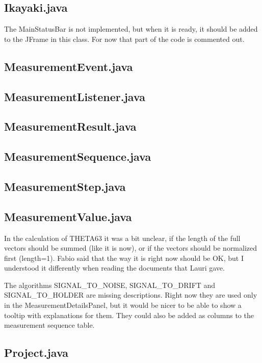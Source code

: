 \subsection{Ikayaki.java}

The MainStatusBar is not implemented, but when it is ready, it should be added to the JFrame in this class. For now that part of the code is commented out.


\subsection{MeasurementEvent.java}

\subsection{MeasurementListener.java}

\subsection{MeasurementResult.java}

\subsection{MeasurementSequence.java}

\subsection{MeasurementStep.java}

\subsection{MeasurementValue.java}

In the calculation of THETA63 it was a bit unclear, if the length of the full vectors should be summed (like it is now), or if the vectors should be normalized first (length=1). Fabio said that the way it is right now should be OK, but I understood it differently when reading the documents that Lauri gave.

The algorithms SIGNAL_TO_NOISE, SIGNAL_TO_DRIFT and SIGNAL_TO_HOLDER are missing descriptions. Right now they are used only in the MeasurementDetailsPanel, but it would be nicer to be able to show a tooltip with explanations for them. They could also be added as columns to the measurement sequence table.


\subsection{Project.java}

